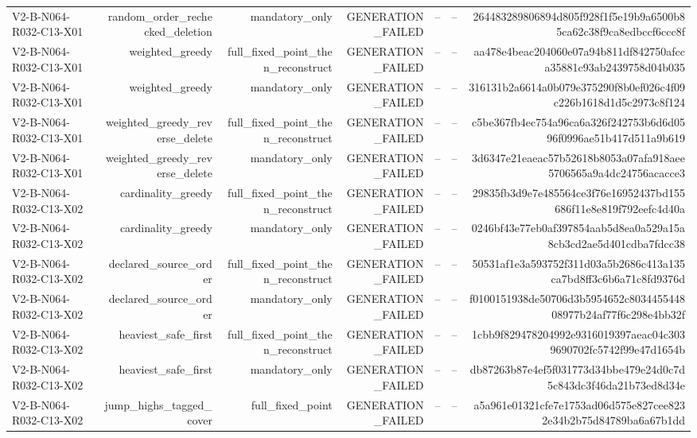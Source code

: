 {\begin{longtable}{lrrrrrr}
V2-B-N064-R032-C13-X01 & random\_order\_rechecked\_deletion & mandatory\_only & GENERATION\_FAILED & -- & -- & 264483289806894d805f928f1f5e19b9a6500b85ca62c38f9ca8edbccf6ccc8f \\
V2-B-N064-R032-C13-X01 & weighted\_greedy & full\_fixed\_point\_then\_reconstruct & GENERATION\_FAILED & -- & -- & aa478e4beac204060e07a94b811df842750afcca35881c93ab2439758d04b035 \\
V2-B-N064-R032-C13-X01 & weighted\_greedy & mandatory\_only & GENERATION\_FAILED & -- & -- & 316131b2a6614a0b079e375290f8b0ef026c4f09c226b1618d1d5c2973c8f124 \\
V2-B-N064-R032-C13-X01 & weighted\_greedy\_reverse\_delete & full\_fixed\_point\_then\_reconstruct & GENERATION\_FAILED & -- & -- & c5be367fb4ec754a96ca6a326f242753b6d6d0596f0996ae51b417d511a9b619 \\
V2-B-N064-R032-C13-X01 & weighted\_greedy\_reverse\_delete & mandatory\_only & GENERATION\_FAILED & -- & -- & 3d6347e21eaeac57b52618b8053a07afa918aee5706565a9a4dc24756acacce3 \\
V2-B-N064-R032-C13-X02 & cardinality\_greedy & full\_fixed\_point\_then\_reconstruct & GENERATION\_FAILED & -- & -- & 29835fb3d9e7e485564ce3f76e16952437bd155686f11e8e819f792eefc4d40a \\
V2-B-N064-R032-C13-X02 & cardinality\_greedy & mandatory\_only & GENERATION\_FAILED & -- & -- & 0246bf43e77eb0af397854aab5d8ea0a529a15a8cb3cd2ae5d401cdba7fdcc38 \\
V2-B-N064-R032-C13-X02 & declared\_source\_order & full\_fixed\_point\_then\_reconstruct & GENERATION\_FAILED & -- & -- & 50531af1e3a593752f311d03a5b2686c413a135ca7bd8ff3c6b6a71c8fd9376d \\
V2-B-N064-R032-C13-X02 & declared\_source\_order & mandatory\_only & GENERATION\_FAILED & -- & -- & f0100151938de50706d3b5954652c803445544808977b24af77f6c298e4bb32f \\
V2-B-N064-R032-C13-X02 & heaviest\_safe\_first & full\_fixed\_point\_then\_reconstruct & GENERATION\_FAILED & -- & -- & 1cbb9f829478204992e9316019397aeac04c3039690702fc5742f99e47d1654b \\
V2-B-N064-R032-C13-X02 & heaviest\_safe\_first & mandatory\_only & GENERATION\_FAILED & -- & -- & db87263b87e4ef5f031773d34bbe479e24d0c7d5c843dc3f46da21b73ed8d34e \\
V2-B-N064-R032-C13-X02 & jump\_highs\_tagged\_cover & full\_fixed\_point & GENERATION\_FAILED & -- & -- & a5a961e01321cfe7e1753ad06d575e827cee8232e34b2b75d84789ba6a67b1dd \\

\end{longtable}}
